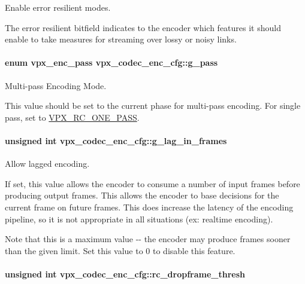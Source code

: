 \-Enable error resilient modes. 

\-The error resilient bitfield indicates to the encoder which features it should enable to take measures for streaming over lossy or noisy links. \hypertarget{structvpx__codec__enc__cfg_a70d62d87aae7d1168746577f14a6dccf}{
\paragraph[{g\-\_\-pass}]{\setlength{\rightskip}{0pt plus 5cm}enum {\bf vpx\-\_\-enc\-\_\-pass} {\bf vpx\-\_\-codec\-\_\-enc\-\_\-cfg\-::g\-\_\-pass}}}
\label{structvpx__codec__enc__cfg_a70d62d87aae7d1168746577f14a6dccf}


\-Multi-\/pass \-Encoding \-Mode. 

\-This value should be set to the current phase for multi-\/pass encoding. \-For single pass, set to \hyperlink{group__encoder_gga476c5417f9c15a1dc5d3f68fa44c493fa7b6943a41868e8e26a77e9500f139ca1}{\-V\-P\-X\-\_\-\-R\-C\-\_\-\-O\-N\-E\-\_\-\-P\-A\-S\-S}. \hypertarget{structvpx__codec__enc__cfg_a992668d9e30305f3f7ab2672ea31a890}{
\paragraph[{g\-\_\-lag\-\_\-in\-\_\-frames}]{\setlength{\rightskip}{0pt plus 5cm}unsigned int {\bf vpx\-\_\-codec\-\_\-enc\-\_\-cfg\-::g\-\_\-lag\-\_\-in\-\_\-frames}}}
\label{structvpx__codec__enc__cfg_a992668d9e30305f3f7ab2672ea31a890}


\-Allow lagged encoding. 

\-If set, this value allows the encoder to consume a number of input frames before producing output frames. \-This allows the encoder to base decisions for the current frame on future frames. \-This does increase the latency of the encoding pipeline, so it is not appropriate in all situations (ex\-: realtime encoding).

\-Note that this is a maximum value -\/-\/ the encoder may produce frames sooner than the given limit. \-Set this value to 0 to disable this feature. \hypertarget{structvpx__codec__enc__cfg_a619269f9a6904de58c4790e6806a3905}{
\paragraph[{rc\-\_\-dropframe\-\_\-thresh}]{\setlength{\rightskip}{0pt plus 5cm}unsigned int {\bf vpx\-\_\-codec\-\_\-enc\-\_\-cfg\-::rc\-\_\-dropframe\-\_\-thresh}}}
\label{structvpx__codec__enc__cfg_a619269f9a6904de58c4790e6806a3905}


